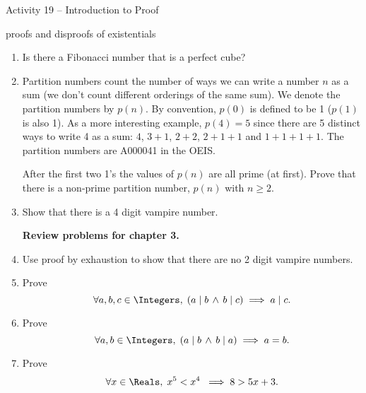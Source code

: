 \documentclass{amsart}
\begin{document}
\thispagestyle{empty}

\centerline{\Large Activity 19 -- Introduction to Proof}
\centerline{\large proofs and disproofs of existentials}

\bigskip
\Large


\begin{enumerate}

\item Is there a Fibonacci number that is a perfect cube?

\vfill

\item Partition numbers count the number of ways we can write a number $n$ as a sum (we don't count different orderings of the same sum).   We denote the partition numbers by $p(n)$.  By convention, $p(0)$ is defined to be 1 ($p(1)$ is also 1).  As a more interesting example, $p(4) = 5$ since there are 5 distinct ways to write 4 as a sum: $4$, $3+1$, $2+2$, $2+1+1$ and $1+1+1+1$.  The partition numbers are A000041 in the OEIS.

After the first two 1's the values of $p(n)$ are all prime (at first).  Prove that there is a non-prime partition number, $p(n)$ with $n \geq 2$.

\vfill

\item Show that there is a 4 digit vampire number.

\vfill

\newpage

\centerline{\bf Review problems for chapter 3.}

\item Use proof by exhaustion to show that there are no 2 digit vampire numbers.

\vfill

\item Prove
\[ \forall a, b, c \in \Integers, \; ( a \mid b \, \land \, b \mid c ) \implies a \mid c. \]

\vfill

\newpage

\item Prove 
\[ \forall a, b \in \Integers, \; ( a \mid b \, \land \, b \mid a ) \implies a=b. \]

\vfill 

\item Prove 
\[ \forall x \in \Reals, \; x^5 < x^4 \; \implies 8 > 5x+3. \]

\vfill

\newpage


\end{enumerate}
\end{document}
